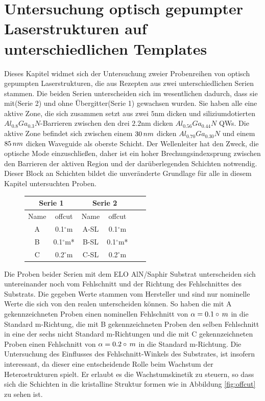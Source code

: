 \thispagestyle{fancy}
\justifying
\section{Untersuchung optisch gepumpter Laserstrukturen auf unterschiedlichen Templates}
Dieses Kapitel widmet sich der Untersuchung zweier Probenreihen von optisch gepumpten Laserstrukturen, die aus Rezepten aus zwei unterschiedlichen Serien stammen. Die beiden Serien unterscheiden sich im wesentlichen dadurch, dass sie mit(Serie 2) und ohne Übergitter(Serie 1) gewachsen wurden. Sie haben alle eine aktive Zone, die sich zusammen setzt aus zwei $5$nm dicken und siliziumdotierten $ Al_{0.8}Ga_{0.3}N$-Barrieren zwischen den drei $2.2$nm dicken $ Al_{0.56}Ga_{0.44}N$ QWs. Die aktive Zone befindet sich zwischen einem $30 \thinspace nm$ dicken $ Al_{0.70}Ga_{0.30}N$ und einem $85 \thinspace nm$ dicken Waveguide als oberste Schicht. Der Wellenleiter hat den Zweck, die optische Mode einzuschließen, daher ist ein hoher Brechungsindexsprung zwischen den Barrieren der aktiven Region und der darüberlegenden Schichten notwendig.
Dieser Block an Schichten bildet die unveränderte Grundlage für alle in diesem Kapitel untersuchten Proben.
\begin{figure}[H]
\centering
\begin{tabular}{ |c|c|c|c|c|c|   }
\hline
\multicolumn{2}{|c|}{Serie 1} & \multicolumn{2}{c|}{Serie 2}  \\
\hline
Name & offcut&  Name & offcut  \\
\hline
A & 0.1$^\circ$m  & A-SL & 0.1$^\circ$m \\
B & 0.1$^\circ$m* & B-SL & 0.1$^\circ$m* \\
C & 0.2$^\circ$m  & C-SL & 0.2$^\circ$m \\
\hline
\end{tabular}
\end{figure}
\noindent 
Die Proben beider Serien mit dem ELO AlN/Saphir Substrat unterscheiden sich untereinander noch vom Fehlschnitt und der Richtung des Fehlschnittes des Substrats. Die gegeben Werte stammen vom Hersteller und sind nur nominelle Werte die sich von den realen unterscheiden können. So haben die mit A gekennzeichneten Proben einen nominellen Fehlschnitt von $\alpha = 0.1\circ \thinspace m$ in die Standard m-Richtung, die mit B gekennzeichneten Proben den selben Fehlschnitt in eine der sechs nicht Standard m-Richtungen und die mit C gekennzeichneten Proben einen Fehlschnitt von $\alpha = 0.2\circ \thinspace m$ in die Standard m-Richtung. 
Die Untersuchung des Einflusses des Fehlschnitt-Winkels des Substrates, ist insofern interessant, da dieser eine entscheidende Rolle beim Wachstum der Heterostrukturen spielt. Er erlaubt es die Wachstumskinetik zu steuern, so dass sich die Schichten in die kristalline Struktur formen wie in Abbildung \ref{fig:offcut} zu sehen ist.
